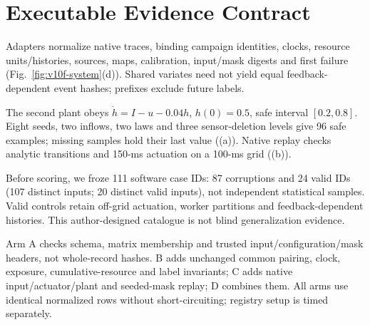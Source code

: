 \section{Executable Evidence Contract}
Adapters normalize native traces, binding campaign identities, clocks, resource units/histories, sources, maps, calibration, input/mask digests and first failure (Fig.~\ref{fig:v10f-system}(d)). Shared variates need not yield equal feedback-dependent event hashes; prefixes exclude future labels.

The second plant obeys $\dot h=I-u-0.04h$, $h(0)=0.5$, safe interval $[0.2,0.8]$. Eight seeds, two inflows, two laws and three sensor-deletion levels give 96 safe examples; missing samples hold their last value (\reuseRef(a)). Native replay checks analytic transitions and 150-ms actuation on a 100-ms grid (\reuseRef(b)).

Before scoring, we froze 111 software case IDs: 87 corruptions and 24 valid IDs (107 distinct inputs; 20 distinct valid inputs), not independent statistical samples. Valid controls retain off-grid actuation, worker partitions and feedback-dependent histories. This author-designed catalogue is not blind generalization evidence.

Arm A checks schema, matrix membership and trusted input/configuration/mask headers, not whole-record hashes. B adds unchanged common pairing, clock, exposure, cumulative-resource and label invariants; C adds native input/actuator/plant and seeded-mask replay; D combines them. All arms use identical normalized rows without short-circuiting; registry setup is timed separately.
